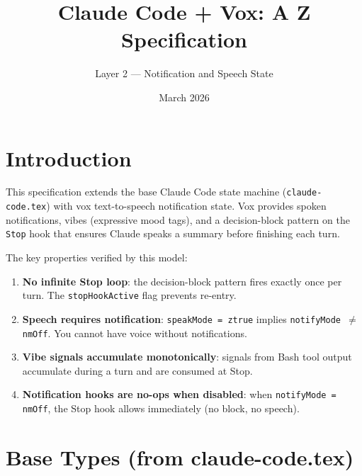 \documentclass[a4paper,10pt,fleqn]{article}
\begin{document}
\title{Claude Code + Vox: A Z Specification}
\author{Layer 2 --- Notification and Speech State}
\date{March 2026}
\maketitle

\tableofcontents
\newpage

\section{Introduction}

This specification extends the base Claude Code state machine
(\texttt{claude-code.tex}) with vox text-to-speech notification state.
Vox provides spoken notifications, vibes (expressive mood tags), and
a decision-block pattern on the \texttt{Stop} hook that ensures Claude
speaks a summary before finishing each turn.

The key properties verified by this model:

\begin{enumerate}
  \item \textbf{No infinite Stop loop}: the decision-block pattern
    fires exactly once per turn. The \texttt{stopHookActive} flag
    prevents re-entry.
  \item \textbf{Speech requires notification}: \texttt{speakMode = ztrue}
    implies \texttt{notifyMode $\neq$ nmOff}. You cannot have voice
    without notifications.
  \item \textbf{Vibe signals accumulate monotonically}: signals from
    Bash tool output accumulate during a turn and are consumed at Stop.
  \item \textbf{Notification hooks are no-ops when disabled}: when
    \texttt{notifyMode = nmOff}, the Stop hook allows immediately
    (no block, no speech).
\end{enumerate}

\section{Base Types (from claude-code.tex)}
\end{document}
